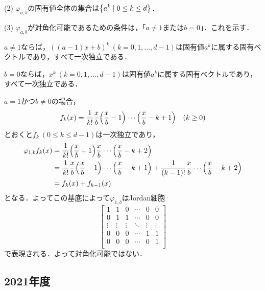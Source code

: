 \documentclass[a4j]{ltjsarticle}
\newcommand{\1}{\mathbbm{1}}
\numberwithin{equation}{section}
\theoremstyle{definition}
\begin{document}
(2) $\varphi_{a,b}$の固有値全体の集合は$\qty{a^k\mid 0\leq k\leq d}$．

(3) $\varphi_{a,b}$が対角化可能であるための条件は，「$a\neq 1$または$b=0$」．これを示す．

$a\neq 1$ならば，$((a-1)x+b)^k\ (k=0,1,\ldots,d-1)$は固有値$a^k$に属する固有ベクトルであり，すべて一次独立である．

$b=0$ならば，$x^k\ (k=0,1,\ldots,d-1)$は固有値$a^k$に属する固有ベクトルであり，すべて一次独立である．

$a=1$かつ$b\neq0$の場合，
\begin{equation}
    f_k(x)=\frac{1}{k!}\frac{x}{b}\qty(\frac{x}{b}-1)\cdots\qty(\frac{x}{b}-k+1)\quad (k\geq0)
\end{equation}
とおくと$f_k\ (0\leq k\leq d-1)$は一次独立であり，
\begin{align}
    \varphi_{1,b}f_{k}(x)&=\frac{1}{k!}\qty(\frac{x}{b}+1)\frac{x}{b}\cdots\qty(\frac{x}{b}-k+2)\\
    &=\frac{1}{k!}\frac{x}{b}\qty(\frac{x}{b}-1)\cdots\qty(\frac{x}{b}-k+1)+\frac{1}{(k-1)!}\frac{x}{b}\cdots\qty(\frac{x}{b}-k+2)\\
    &=f_{k}(x)+f_{k-1}(x)
\end{align}
となる．よってこの基底によって$\varphi_{1,b}$はJordan細胞
\begin{equation}
    \begin{bmatrix}
        1 & 1 & 0 & \cdots & 0 & 0 \\
        0 & 1 & 1 & \cdots & 0 & 0 \\
        \vdots & \vdots & \vdots & \ddots & \vdots & \vdots \\
        0 & 0 & 0 & \cdots & 1 & 1 \\
        0 & 0 & 0 & \cdots & 0 & 1 \\
    \end{bmatrix}
\end{equation}
で表現される．よって対角化可能ではない．

\subsection{2021年度}
\end{document}
